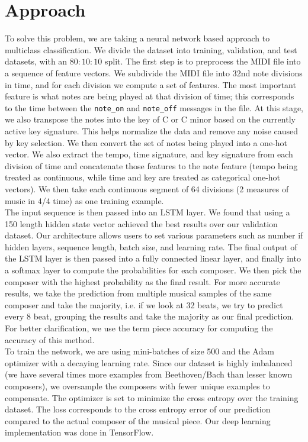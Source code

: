 \documentclass[11pt,a4paper]{article}
\begin{document}
\section{Approach}
To solve this problem, we are taking a neural network based approach to multiclass classification. We divide the dataset into training, validation, and test datasets, with an $80:10:10$ split. The first step is to preprocess the MIDI file into a sequence of feature vectors. We subdivide the MIDI file into 32nd note divisions in time, and for each division we compute a set of features. The most important feature is what notes are being played at that division of time; this corresponds to the time between the \texttt{note\_on}  and \texttt{note\_off}  messages in the file. At this stage, we also transpose the notes into the key of C or C minor based on the currently active key signature. This helps normalize the data and remove any noise caused by key selection. We then convert the set of notes being played into a one-hot vector. We also extract the tempo, time signature, and key signature from each division of time and concatenate those features to the note feature (tempo being treated as continuous, while time and key are treated as categorical one-hot vectors). We then take each continuous  segment of 64 divisions (2 measures of music in 4/4 time) as one training example.\\
The input sequence is then passed into an LSTM layer. We found that using a 150 length hidden state vector achieved the best results over our validation dataset. Our architecture allows users to set various parameters such as number if hidden layers, sequence length, batch size, and learning rate. The final output of the LSTM layer is then passed into a fully connected linear layer, and finally into a softmax layer to compute the probabilities for each composer. We then pick the composer with the highest probability as the final result. For more accurate results, we take the prediction from multiple musical samples of the same composer and take the majority, i.e. if we look at 32 beats, we try to predict every 8 beat, grouping the results and take the majority as our final prediction. For better clarification, we use the term piece accuracy for computing the accuracy of this method.\\
To train the network, we are using mini-batches of size 500 and the Adam optimizer with a decaying learning rate. Since our dataset is highly imbalanced (we have several times more examples from Beethoven/Bach than lesser known composers), we oversample the composers with fewer unique examples to compensate. The optimizer is set to minimize the cross entropy over the training dataset. The loss corresponds to the cross entropy error of our prediction compared to the actual composer of the musical piece. Our deep learning implementation was done in TensorFlow.\\
\end{document}
